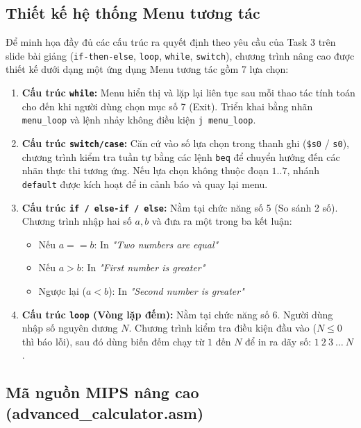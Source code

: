 \documentclass[12pt,a4paper]{article}
\newcommand{\MipsPath}{mips/}%
\newcommand{\MipsPath}{../mips/}%
\begin{document}
\subsection{Thiết kế hệ thống Menu tương tác}
Để minh họa đầy đủ các cấu trúc ra quyết định theo yêu cầu của Task 3 trên slide bài giảng (\texttt{if-then-else}, \texttt{loop}, \texttt{while}, \texttt{switch}), chương trình nâng cao được thiết kế dưới dạng một ứng dụng Menu tương tác gồm 7 lựa chọn:
\begin{enumerate}
    \item \textbf{Cấu trúc \texttt{while}:} Menu hiển thị và lặp lại liên tục sau mỗi thao tác tính toán cho đến khi người dùng chọn mục số 7 (Exit). Triển khai bằng nhãn \texttt{menu\_loop} và lệnh nhảy không điều kiện \texttt{j menu\_loop}.
    \item \textbf{Cấu trúc \texttt{switch/case}:} Căn cứ vào số lựa chọn trong thanh ghi (\texttt{\$s0} / \texttt{s0}), chương trình kiểm tra tuần tự bằng các lệnh \texttt{beq} để chuyển hướng đến các nhãn thực thi tương ứng. Nếu lựa chọn không thuộc đoạn $1..7$, nhánh \texttt{default} được kích hoạt để in cảnh báo và quay lại menu.
    \item \textbf{Cấu trúc \texttt{if / else-if / else}:} Nằm tại chức năng số 5 (So sánh 2 số). Chương trình nhập hai số $a, b$ và đưa ra một trong ba kết luận:
    \begin{itemize}
        \item Nếu $a == b$: In \textit{"Two numbers are equal"}
        \item Nếu $a > b$: In \textit{"First number is greater"}
        \item Ngược lại ($a < b$): In \textit{"Second number is greater"}
    \end{itemize}
    \item \textbf{Cấu trúc \texttt{loop} (Vòng lặp đếm):} Nằm tại chức năng số 6. Người dùng nhập số nguyên dương $N$. Chương trình kiểm tra điều kiện đầu vào ($N \le 0$ thì báo lỗi), sau đó dùng biến đếm chạy từ $1$ đến $N$ để in ra dãy số: $1\ 2\ 3\ \dots\ N$.
\end{enumerate}

\subsection{Mã nguồn MIPS nâng cao (advanced\_calculator.asm)}

\end{document}
